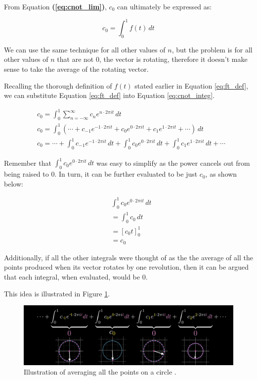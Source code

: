 \documentclass[letterpaper, 12pt]{article}
\begin{document}
From Equation \textbf{(\ref*{eq:cnot_lim})}, \(c_0\) can ultimately be expressed as:

\begin{equation}
    c_0 = \int_{0}^{1} f(t) \,dt
    \label{eq:cnot_integ}
\end{equation}


We can use the same technique for all other values of \(n\), but the problem is
for all other values of \(n\) that are not 0, the vector is rotating, therefore
it doesn't make sense to take the average of the rotating vector.

Recalling the thorough definition of \(f(t)\) stated earlier in Equation \ref*{eq:ft_def},
we can substitute Equation \ref*{eq:ft_def} into Equation \ref*{eq:cnot_integ}.

\begin{align*}
     & c_0 = \int_{0}^{1} \sum_{n=-\infty}^{\infty} c_n e^{n \cdot 2\pi it} \,dt
    \\
     & c_0 = \int_{0}^{1} \left( \cdots + c_{-1} e^{-1 \cdot 2\pi it} + c_{0} e^{0 \cdot 2\pi it} + c_{1} e^{1 \cdot 2\pi it} + \cdots \right) \,dt
    \\
     & c_0 = \cdots + \int_{0}^{1} c_{-1} e^{-1 \cdot 2\pi it} \,dt + \int_{0}^{1} c_{0} e^{0 \cdot 2\pi it} \,dt + \int_{0}^{1} c_{1} e^{1 \cdot 2\pi it} \,dt + \cdots
\end{align*}

Remember that \(\int_{0}^{1} c_{0} e^{0 \cdot 2\pi it} \,dt\) was easy to simplify
as the power cancels out from being raised to 0. In turn, it can be further
evaluated to be just \(c_0\), as shown below:

\begin{align*}
     & \int_{0}^{1} c_{0} e^{0 \cdot 2\pi it} \,dt
    \\
     & = \int_{0}^{1} c_{0} \,dt
    \\
     & = [c_{0}t]_{0}^1
    \\
     & = c_{0}
\end{align*}

Additionally, if all the other integrals were thought of as the the average of all
the points produced when its vector rotates by one revolution, then it can
be argued that each integral, when evaluated, would be 0.

This idea is illustrated in Figure \ref*{fig:circle_integ}.

\begin{figure}[H]
    \centering
    \includegraphics[width=\textwidth]{circle_integ.jpeg}
    \caption{Illustration of averaging all the points on a circle \protect\cite{sandersonWhatFourierSeries2019}.}
    \label{fig:circle_integ}
\end{figure}
\end{document}

